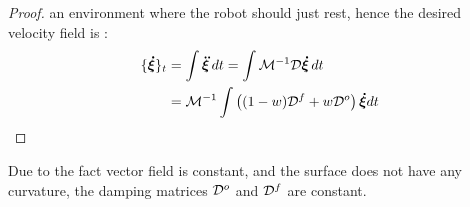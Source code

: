 
\begin{proof}

an environment where the robot should just rest, hence the desired velocity field is :
\begin{equation}
\begin{split}
	\{ \vecs{\dot \xi} \}_{t} 
	& = \int \vecs{\ddot \xi} \, dt = \int \matd{M}^{-1} \matd{D} \vecs{\dot \xi} \, dt \\
	& = \matd{M}^{-1} \int \left( (1 - w) \matd{D}^f + w \matd{D}^{o} \right)  \vecs{\dot \xi} dt\\
	\end{split}
\label{eq:velocity_evolution}
\end{equation}

\end{proof}
Due to the fact vector field is constant, and the surface does not have any curvature, the damping matrices $\mathcal{D}^o$ and $\mathcal{D}^f$ are constant. 

